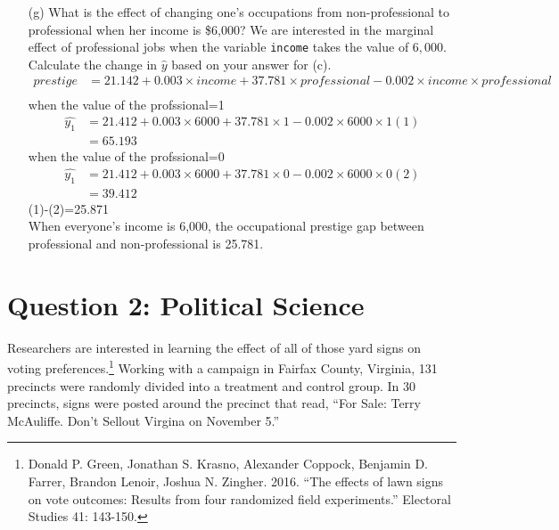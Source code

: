 \documentclass[12pt,letterpaper]{article}
\begin{document}
\begin{enumerate}
	\newpage
	\item [(g)]
	What is the effect of changing one's occupations from non-professional to professional when her income is \$6,000? We are interested in the marginal effect of professional jobs when the variable \texttt{income} takes the value of $6,000$. Calculate the change in $\hat{y}$ based on your answer for (c).
		\vspace{10mm}
	\begin{align*}
		prestige&= 21.142 + 0.003\times income + 37.781\times professional -0.002\times income\times professional\\ 
\end{align*}
when the value of the profssional=1
    \begin{align*}
	\hat{y_1}&=21.412+0.003\times 6000+37.781\times1-0.002\times 6000\times 1  (1)\\
	&=65.193
\end{align*}
when the value of the profssional=0
    \begin{align*}
	\hat{y_1}&=21.412+0.003\times 6000+37.781\times0-0.002\times 6000\times 0  (2)\\
	&=39.412
\end{align*}
(1)-(2)=25.871\\

When everyone's income is 6,000, the occupational prestige gap between professional and non-professional is 25.781.



	
\end{enumerate}

\newpage

\section*{Question 2: Political Science}
\vspace{.25cm}
\noindent 	Researchers are interested in learning the effect of all of those yard signs on voting preferences.\footnote{Donald P. Green, Jonathan	S. Krasno, Alexander Coppock, Benjamin D. Farrer,	Brandon Lenoir, Joshua N. Zingher. 2016. ``The effects of lawn signs on vote outcomes: Results from four randomized field experiments.'' Electoral Studies 41: 143-150. } Working with a campaign in Fairfax County, Virginia, 131 precincts were randomly divided into a treatment and control group. In 30 precincts, signs were posted around the precinct that read, ``For Sale: Terry McAuliffe. Don't Sellout Virgina on November 5.'' \\
\end{document}

